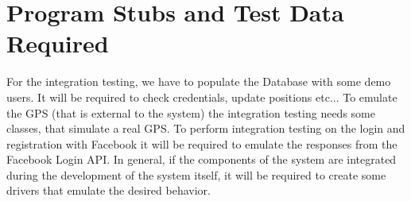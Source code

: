 \documentclass[../../testPlan.tex]{subfiles}
\begin{document}
	\chapter{Program Stubs and Test Data Required}

		For the integration testing, we have to populate the Database with some demo users. It will be required to check credentials, update positions etc...
		To emulate the GPS (that is external to the system) the integration testing needs some classes, that simulate a real GPS.
		To perform integration testing on the login and registration with Facebook it will be required to emulate the responses from the Facebook Login API.
		In general, if the components of the system are integrated during the development of the system itself, it will be required to create some drivers that emulate the desired behavior.
\end{document}

